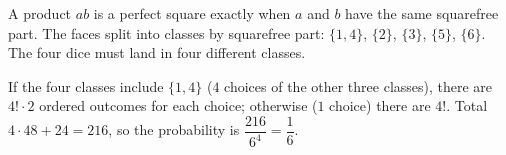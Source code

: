 A product $ab$ is a perfect square exactly when $a$ and $b$ have the same squarefree part. The faces split into classes by squarefree part: $\{1,4\}$, $\{2\}$, $\{3\}$, $\{5\}$, $\{6\}$. The four dice must land in four different classes.

If the four classes include $\{1,4\}$ ($4$ choices of the other three classes), there are $4!\cdot2$ ordered outcomes for each choice; otherwise ($1$ choice) there are $4!$. Total $4\cdot48+24=216$, so the probability is $\dfrac{216}{6^4}=\boxed{\dfrac16}$.
